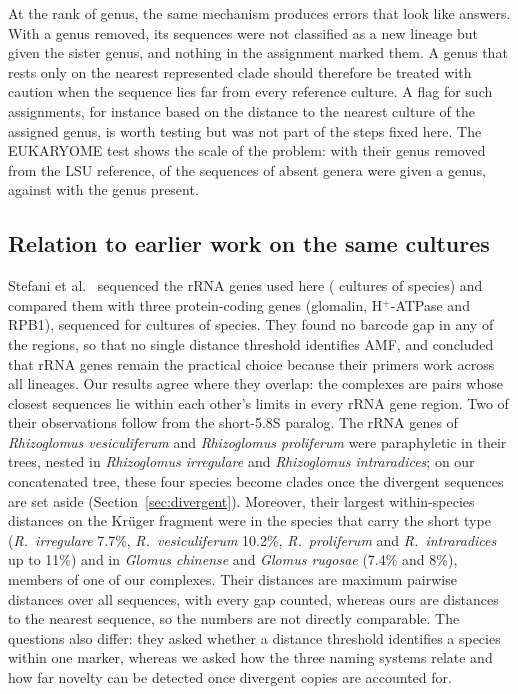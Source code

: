 \documentclass[11pt]{article}
\newcommand{\spn}[1]{\emph{#1}}   %
\begin{document}
At the rank of genus, the same mechanism produces errors that look like answers. With a genus removed, its sequences
were not classified as a new lineage but given the sister genus, and nothing in the assignment marked them. A genus
that rests only on the nearest represented clade should therefore be treated with caution when the sequence lies far
from every reference culture. A flag for such assignments, for instance based on the distance to the nearest culture
of the assigned genus, is worth testing but was not part of the steps fixed here. The EUKARYOME test shows the scale
of the problem: with their genus removed from the LSU reference, \EkFxLinGivenPct{} of the sequences of absent genera
were given a genus, against \EkFxLinGivenAPct{} with the genus present.

\subsection{Relation to earlier work on the same cultures}\label{sec:stefani}
Stefani et al.\ \cite{stefani2025rdna} sequenced the rRNA genes used here (\StefaniCultures{} cultures of
\StefaniSpecies{} species) and compared them with three protein-coding genes (glomalin, H$^+$-ATPase and RPB1),
sequenced for \StefaniPCCultures{} cultures of \StefaniPCSpecies{} species. They found no barcode gap in any of the
regions, so that no single distance threshold identifies AMF, and concluded that rRNA genes remain the practical
choice because their primers work across all lineages. Our results agree where they overlap: the complexes are pairs
whose closest sequences lie within each other's limits in every rRNA gene region. Two of their observations follow
from the short-5.8S paralog. The rRNA genes of \spn{Rhizoglomus vesiculiferum} and \spn{Rhizoglomus proliferum} were
paraphyletic in their trees, nested in \spn{Rhizoglomus irregulare} and \spn{Rhizoglomus intraradices}; on our
concatenated tree, these four species become clades once the divergent sequences are set aside
(Section~\ref{sec:divergent}). Moreover, their largest within-species distances on the Kr\"uger fragment were in the
species that carry the short type (\spn{R.\ irregulare} 7.7\%, \spn{R.\ vesiculiferum} 10.2\%, \spn{R.\ proliferum}
and \spn{R.\ intraradices} up to 11\%) and in \spn{Glomus chinense} and \spn{Glomus rugosae} (7.4\% and 8\%), members
of one of our complexes. Their distances are maximum pairwise distances over all sequences, with every gap counted,
whereas ours are distances to the nearest sequence, so the numbers are not directly comparable. The questions also
differ: they asked whether a distance threshold identifies a species within one marker, whereas we asked how the
three naming systems relate and how far novelty can be detected once divergent copies are accounted for.
\end{document}
